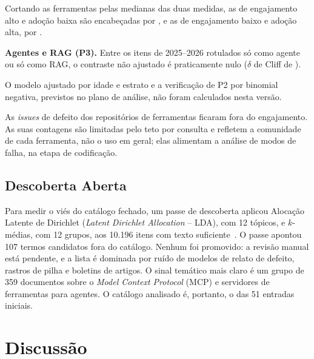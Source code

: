 \documentclass[sigconf]{acmart}
\makeatletter
\newif\ifcomstatsmodels
\newcommand{\DescDocs}{10.196}           %
\newcommand{\DescCandidatos}{107}        %
\newcommand{\DescGrupoMcp}{359}          %
\newcommand{\val}[2]{#1\,=\,#2}
\newcommand{\pval}[1]{\expandafter\msr@pval#1\@nil}
\def\msr@pval#1#2\@nil{$p$\ifx#1\ensuremath\,\else\,=\,\fi#1#2}
\makeatother
\begin{document}
Cortando as \ResRhoN{} ferramentas pelas medianas das duas medidas, as de engajamento alto e adoção baixa são encabeçadas por \ResQuadFalado, e as de engajamento baixo e adoção alta, por \ResQuadAdotado.

\textbf{Agentes e RAG (P3).} Entre os \ResPTresN{} itens de 2025--2026 rotulados só como agente ou só como RAG, o contraste não ajustado é praticamente nulo ($\delta$ de Cliff de \ResPTresDelta).%
\ifcomstatsmodels
{} No modelo ajustado por idade e estrato, o coeficiente de agente é \val{$\beta$}{\ResPTresBeta} [\ResPTresLo; \ResPTresHi] (\pval{\ResPTresP}): o resultado \ResPTresVeredito. Na verificação de robustez de P2, a ordem das ferramentas pelo efeito na binomial negativa correlaciona-se com a da média de $E$ em \val{$\rho$}{\ResNbRho}.
\else
{} O modelo ajustado por idade e estrato e a verificação de P2 por binomial negativa, previstos no plano de análise, não foram calculados nesta versão.
\fi

As \ResDorIssues{} \textit{issues} de defeito dos repositórios de \ResDorFerramentas{} ferramentas ficaram fora do engajamento. As suas contagens são limitadas pelo teto por consulta e refletem a comunidade de cada ferramenta, não o uso em geral; elas alimentam a análise de modos de falha, na etapa de codificação.

\subsection{Descoberta Aberta}
\label{sec:res-descoberta}

Para medir o viés do catálogo fechado, um passe de descoberta aplicou Alocação Latente de Dirichlet (\textit{Latent Dirichlet Allocation} -- LDA), com 12 tópicos, e $k$-médias, com 12 grupos, aos \DescDocs{} itens com texto suficiente~\cite{blei2003lda}. O passe apontou \DescCandidatos{} termos candidatos fora do catálogo. Nenhum foi promovido: a revisão manual está pendente, e a lista é dominada por ruído de modelos de relato de defeito, rastros de pilha e boletins de artigos. O sinal temático mais claro é um grupo de \DescGrupoMcp{} documentos sobre o \textit{Model Context Protocol} (MCP) e servidores de ferramentas para agentes. O catálogo analisado é, portanto, o das 51 entradas iniciais.

\section{Discussão}
\label{sec:discussao}
\end{document}
